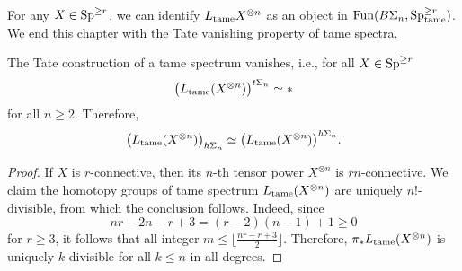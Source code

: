 For any $X\in \operatorname{Sp}^{\geq r}$, we can identify $L_{\operatorname{\operatorname{tame}}}X^{\otimes n}$ as an object in $\operatorname{Fun}(B\Sigma_n, \operatorname{Sp}^{\geq r}_{\operatorname{\operatorname{tame}}})$.
We end this chapter with the Tate vanishing property of tame spectra.
\begin{lemma}
\label{Tate vanishing for tame spectra}
    The Tate construction of a tame spectrum vanishes, i.e., for all $X\in \operatorname{Sp}^{\geq r}$
	$$
	\big(L_{\operatorname{\operatorname{tame}}}(X^{\otimes n})\big)^{t\Sigma_n}\simeq *
	$$
	for all $n\geq 2$. Therefore, 
	$$
	\big(L_{\operatorname{\operatorname{tame}}}(X^{\otimes n})\big)_{h\Sigma_n}
	\simeq
	\big(L_{\operatorname{\operatorname{tame}}}(X^{\otimes n})\big)^{h\Sigma_n}.
	$$
\end{lemma}
\begin{proof}
    If $X$ is $r$-connective, then its $n$-th tensor power $X^{\otimes n}$ is $rn$-connective. We claim the homotopy groups of tame spectrum $L_{\operatorname{\operatorname{tame}}}(X^{\otimes n})$ are uniquely $n!$-divisible, from which the conclusion follows. Indeed, since   
    $$
    nr-2n-r+3 = (r-2)(n-1)+1\geq 0
    $$
    for $r\geq 3$, it follows that all integer  $m\leq \lfloor \frac{nr-r+3}{2}\rfloor$. 
    Therefore, $\pi_{*}L_{\operatorname{\operatorname{tame}}}(X^{\otimes n})$ is uniquely $k$-divisible for all $k\leq n$ in all degrees.
    
\end{proof}